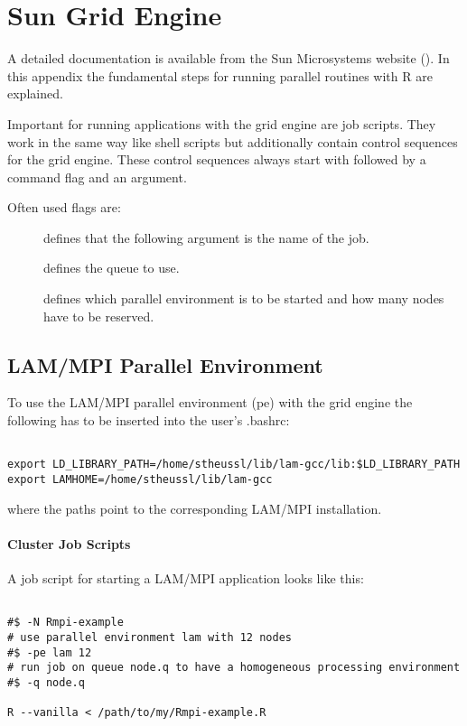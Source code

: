 
\chapter{Sun Grid Engine}
\label{app:gridengine}

A detailed documentation is available from the Sun Microsystems
website (\cite{sge07}). In this appendix the fundamental steps for
running parallel routines with R are explained.

Important for running applications with the grid engine are job
scripts. They work in the same way like shell scripts but additionally
contain control sequences for the grid engine. These control sequences
always start with \code{\#\$} 
followed by a command flag and an argument.

Often used flags are:
\begin{description}
\item[] defines that the following argument is the name of
  the job.  
\item[] defines the queue to use.
\item[] defines which parallel environment is to be started
  and how many nodes have to be reserved.
\end{description}

\section{LAM/MPI Parallel Environment}

To use the LAM/MPI parallel environment (pe) with the grid engine the
following has to be inserted into the user's .bashrc:

\begin{verbatim}

export LD_LIBRARY_PATH=/home/stheussl/lib/lam-gcc/lib:$LD_LIBRARY_PATH
export LAMHOME=/home/stheussl/lib/lam-gcc

\end{verbatim}

where the paths point to the corresponding LAM/MPI installation.

\subsubsection{Cluster Job Scripts}

A job script for starting a LAM/MPI application looks like this:

\begin{verbatim}

#$ -N Rmpi-example
# use parallel environment lam with 12 nodes
#$ -pe lam 12
# run job on queue node.q to have a homogeneous processing environment 
#$ -q node.q

R --vanilla < /path/to/my/Rmpi-example.R
\end{verbatim}

